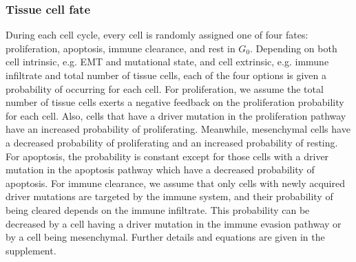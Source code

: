 \documentclass[11pt]{article}
\begin{document}
\subsubsection{Tissue cell fate}
During each cell cycle, every cell is randomly assigned one of four fates: proliferation, apoptosis, immune clearance, and rest in $G_0$.
Depending on both cell intrinsic, e.g. EMT and mutational state, and cell extrinsic, e.g. immune infiltrate and total number of tissue cells, each of the four options is given a probability of occurring for each cell.
For proliferation, we assume the total number of tissue cells exerts a negative feedback on the proliferation probability for each cell.
Also, cells that have a driver mutation in the proliferation pathway have an increased probability of proliferating.
Meanwhile, mesenchymal cells have a decreased probability of proliferating and an increased probability of resting.
For apoptosis, the probability is constant except for those cells with a driver mutation in the apoptosis pathway which have a decreased probability of apoptosis.
For immune clearance, we assume that only cells with newly acquired driver mutations are targeted by the immune system, and their probability of being cleared depends on the immune infiltrate.
This probability can be decreased by a cell having a driver mutation in the immune evasion pathway or by a cell being mesenchymal.
Further details and equations are given in the supplement.
\end{document}
